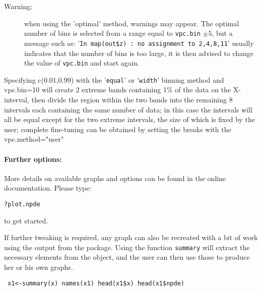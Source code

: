 \begin{description} 
\item[Warning:] when using the 'optimal' method, warnings may appear. The optimal number of bins is selected from 
a range equal to \texttt{vpc.bin} $\pm 5$, but a message such as:
'\verb+In map(out$z) : no assignment to 2,4,8,11+' usually indicates that the number of bins is too large, it is 
then advised to change the value of \texttt{vpc.bin} and start again. 
\end{description}

Specifying c(0.01,0.99) with the '\texttt{equal}' or '\texttt{width}' binning method and vpc.bin=10 will create 2 
extreme bands containing 1\% of the data on the X-interval, then divide the region within the two bands into the 
remaining 8 intervals each containing the same number of data; in this case the intervals will all be equal except 
for the two extreme intervals, the size of which is fixed by the user; complete fine-tuning can be obtained by 
setting the breaks with the vpc.method="user"

\paragraph{Further options:} More details on available graphs and options can be found in the online documentation. 
Please type: 
\begin{verbatim} 
?plot.npde 
\end{verbatim} to get started. 

If further tweaking is required, any graph can also be recreated with a bit of work using the output from the 
package. Using the function \texttt{summary} will extract the necessary elements from the object, and the user can 
then use those to produce her or his own graphs. \begin{verbatim} x1<-summary(x) names(x1) head(x1$x) head(x1$npde) 
\end{verbatim}

\clearpage \newpage
